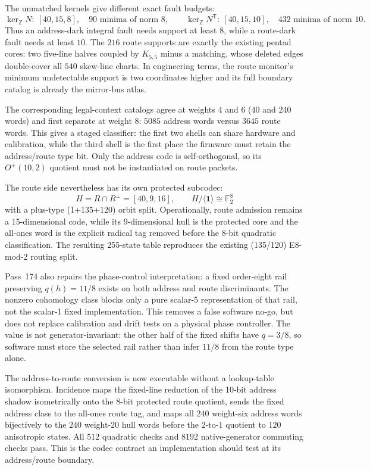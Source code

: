 \documentclass[11pt]{article}
\begin{document}
The unmatched kernels give different exact fault budgets:
\[
\ker_{\mathbb Z}N:\ [40,15,8],\quad 90\text{ minima of norm }8,
\qquad
\ker_{\mathbb Z}N^{\mathsf T}:\ [40,15,10],\quad 432\text{ minima of norm }10.
\]
Thus an address-dark integral fault needs support at least $8$, while a route-dark fault needs at least
$10$.  The $216$ route supports are exactly the existing pentad cores: two five-line halves coupled by
$K_{5,5}$ minus a matching, whose deleted edges double-cover all $540$ skew-line charts.  In engineering
terms, the route monitor's minimum undetectable support is two coordinates higher and its full boundary
catalog is already the mirror-bus atlas.

The corresponding legal-context catalogs agree at weights $4$ and $6$ ($40$ and $240$ words) and first
separate at weight $8$: $5085$ address words versus $3645$ route words.  This gives a staged classifier:
the first two shells can share hardware and calibration, while the third shell is the first place the
firmware must retain the address/route type bit.  Only the address code is self-orthogonal, so its
$O^+(10,2)$ quotient must not be instantiated on route packets.

The route side nevertheless has its own protected subcodec:
\[
H=R\cap R^\perp=[40,9,16],
\qquad H/\langle\mathbf1\rangle\cong\mathbb F_2^8
\]
with a plus-type (1+135+120) orbit split.  Operationally, route admission remains a 15-dimensional
code, while its 9-dimensional hull is the protected core and the all-ones word is the explicit radical
tag removed before the 8-bit quadratic classification.  The resulting 255-state table reproduces the
existing (135/120) E8-mod-2 routing split.

Pass~174 also repairs the phase-control interpretation: a fixed order-eight rail preserving
$q(h)=11/8$ exists on both address and route discriminants.  The nonzero cohomology class blocks only a
pure scalar-5 representation of that rail, not the scalar-1 fixed implementation.  This removes a false
software no-go, but does not replace calibration and drift tests on a physical phase controller.  The
value is not generator-invariant: the other half of the fixed shifts have $q=3/8$, so software must store
the selected rail rather than infer $11/8$ from the route type alone.

The address-to-route conversion is now executable without a lookup-table isomorphism.  Incidence maps the
fixed-line reduction of the 10-bit address shadow isometrically onto the 8-bit protected route quotient,
sends the fixed address class to the all-ones route tag, and maps all $240$ weight-six address words
bijectively to the $240$ weight-20 hull words before the $2$-to-$1$ quotient to $120$ anisotropic states.
All $512$ quadratic checks and $8192$ native-generator commuting checks pass.  This is the codec contract
an implementation should test at its address/route boundary.
\end{document}
